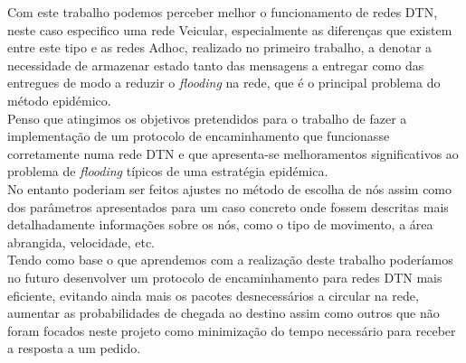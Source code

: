 \documentclass{llncs}
\begin{document}
Com este trabalho podemos perceber melhor o funcionamento de redes DTN, neste caso especifico uma rede Veicular, especialmente as diferenças que existem entre este tipo e as redes Adhoc, realizado no primeiro trabalho, a denotar a necessidade de armazenar estado tanto das mensagens a entregar como das entregues de modo a reduzir o \emph{flooding} na rede, que é o principal problema do método epidémico.\\
Penso que atingimos os objetivos pretendidos para o trabalho de fazer a implementação de um protocolo de encaminhamento que funcionasse corretamente numa rede DTN e que apresenta-se melhoramentos significativos ao problema de \emph{flooding} típicos de uma estratégia epidémica.\\
No entanto poderiam ser feitos ajustes no método de escolha de nós assim como dos parâmetros apresentados para um caso concreto onde fossem descritas mais detalhadamente informações sobre os nós, como o tipo de movimento, a área abrangida, velocidade, etc.\\
Tendo como base o que aprendemos com a realização deste trabalho poderíamos no futuro desenvolver um protocolo de encaminhamento para redes DTN mais eficiente, evitando ainda mais os pacotes desnecessários a circular na rede, aumentar as probabilidades de chegada ao destino assim como outros que não foram focados neste projeto como minimização do tempo necessário para receber a resposta a um pedido.

\clearpage
\end{document}
